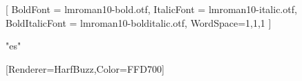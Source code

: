 \usepackage{graphicx}
\usepackage{float}
\usepackage{seqsplit}
\usepackage{needspace}
\usepackage{enumitem}

\usepackage{xcolor}
\usepackage{fontspec}
\usepackage{etoolbox}

\usepackage{fvextra}
\usepackage{makecell}

\usepackage[strings]{underscore}

\makeatletter
\def\fps@figure{H}
\def\fps@table{H}
\makeatother

\usepackage{longtable}
\usepackage{array}
\usepackage{booktabs}
\usepackage{tabularx}
\usepackage{multirow}

\setlength{\tabcolsep}{3pt}
\renewcommand{\arraystretch}{1.5}



\setmainfont{lmroman10-regular.otf}[
  BoldFont = lmroman10-bold.otf,
  ItalicFont = lmroman10-italic.otf,
  BoldItalicFont = lmroman10-bolditalic.otf,
  WordSpace={1,1,1}
]

\XeTeXlinebreaklocale "es"

\ifdefined\XeTeXgenerateactualtext
\fi

\usepackage{newunicodechar}
[Renderer=HarfBuzz,Color=FFD700]

\usepackage{listings}

